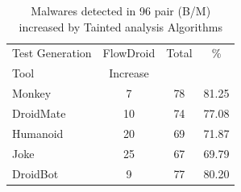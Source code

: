 \begin{table}[ht]
\centering
\begin{tabular}{lccc}\toprule
 Test Generation & FlowDroid & Total & \%\\
 Tool & Increase  &  & \\ \midrule
 Monkey & 7 & 78 & 81.25\\
 DroidMate & 10 &  74 & 77.08 \\
 Humanoid & 20 & 69 & 71.87  \\
 Joke & 25 & 67 & 69.79 \\
 DroidBot & 9 & 77 & 80.20  \\\midrule
 
\end{tabular} 
\caption{Malwares detected in 96 pair (B/M) increased by Tainted analysis Algorithms}
\label{tab:tanted}
\end{table}




